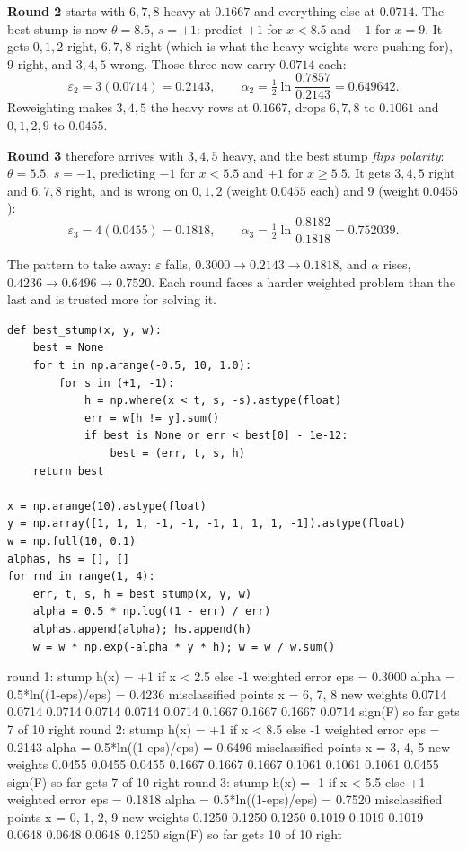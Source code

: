 \documentclass[11pt]{article}
\begin{document}
\begin{worked}
\textbf{Round 2} starts with $6, 7, 8$ heavy at $0.1667$ and everything else at
$0.0714$. The best stump is now $\theta = 8.5$, $s = +1$: predict $+1$ for
$x < 8.5$ and $-1$ for $x = 9$. It gets $0,1,2$ right, $6,7,8$ right (which is
what the heavy weights were pushing for), $9$ right, and $3,4,5$ wrong. Those
three now carry $0.0714$ each:
\[
  \varepsilon_2 = 3(0.0714) = \mathbf{0.2143},
  \qquad
  \alpha_2 = \tfrac12 \ln\frac{0.7857}{0.2143} = \mathbf{0.649642}.
\]
Reweighting makes $3, 4, 5$ the heavy rows at $0.1667$, drops $6,7,8$ to
$0.1061$ and $0,1,2,9$ to $0.0455$.

\textbf{Round 3} therefore arrives with $3, 4, 5$ heavy, and the best stump
\emph{flips polarity}: $\theta = 5.5$, $s = -1$, predicting $-1$ for $x < 5.5$
and $+1$ for $x \geq 5.5$. It gets $3,4,5$ right and $6,7,8$ right, and is
wrong on $0,1,2$ (weight $0.0455$ each) and $9$ (weight $0.0455$):
\[
  \varepsilon_3 = 4(0.0455) = \mathbf{0.1818},
  \qquad
  \alpha_3 = \tfrac12 \ln\frac{0.8182}{0.1818} = \mathbf{0.752039}.
\]

The pattern to take away: $\varepsilon$ falls, $0.3000 \to 0.2143 \to 0.1818$,
and $\alpha$ rises, $0.4236 \to 0.6496 \to 0.7520$. Each round faces a harder
weighted problem than the last and is trusted more for solving it.
\end{worked}

\begin{lstlisting}
def best_stump(x, y, w):
    best = None
    for t in np.arange(-0.5, 10, 1.0):
        for s in (+1, -1):
            h = np.where(x < t, s, -s).astype(float)
            err = w[h != y].sum()
            if best is None or err < best[0] - 1e-12:
                best = (err, t, s, h)
    return best

x = np.arange(10).astype(float)
y = np.array([1, 1, 1, -1, -1, -1, 1, 1, 1, -1]).astype(float)
w = np.full(10, 0.1)
alphas, hs = [], []
for rnd in range(1, 4):
    err, t, s, h = best_stump(x, y, w)
    alpha = 0.5 * np.log((1 - err) / err)
    alphas.append(alpha); hs.append(h)
    w = w * np.exp(-alpha * y * h); w = w / w.sum()
\end{lstlisting}
\begin{codeout}
round 1: stump  h(x) = +1 if x < 2.5 else -1
   weighted error  eps = 0.3000
   alpha = 0.5*ln((1-eps)/eps) = 0.4236
   misclassified points x = 6, 7, 8
   new weights 0.0714 0.0714 0.0714 0.0714 0.0714 0.0714 0.1667 0.1667 0.1667 0.0714
   sign(F) so far gets 7 of 10 right
round 2: stump  h(x) = +1 if x < 8.5 else -1
   weighted error  eps = 0.2143
   alpha = 0.5*ln((1-eps)/eps) = 0.6496
   misclassified points x = 3, 4, 5
   new weights 0.0455 0.0455 0.0455 0.1667 0.1667 0.1667 0.1061 0.1061 0.1061 0.0455
   sign(F) so far gets 7 of 10 right
round 3: stump  h(x) = -1 if x < 5.5 else +1
   weighted error  eps = 0.1818
   alpha = 0.5*ln((1-eps)/eps) = 0.7520
   misclassified points x = 0, 1, 2, 9
   new weights 0.1250 0.1250 0.1250 0.1019 0.1019 0.1019 0.0648 0.0648 0.0648 0.1250
   sign(F) so far gets 10 of 10 right
\end{codeout}
\end{document}

